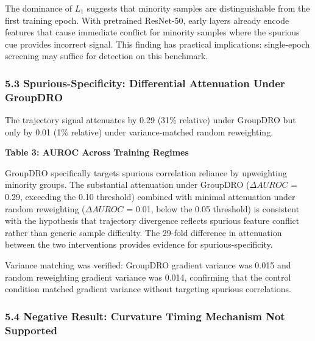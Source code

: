 The dominance of $L_1$ suggests that minority samples are distinguishable from the first training epoch. With pretrained ResNet-50, early layers already encode features that cause immediate conflict for minority samples where the spurious cue provides incorrect signal. This finding has practical implications: single-epoch screening may suffice for detection on this benchmark.

\subsubsection{5.3 Spurious-Specificity: Differential Attenuation Under GroupDRO}

The trajectory signal attenuates by 0.29 (31\% relative) under GroupDRO but only by 0.01 (1\% relative) under variance-matched random reweighting.

\textbf{Table 3: AUROC Across Training Regimes}

\begin{table}[htbp]
\centering
{}
\end{table}

GroupDRO specifically targets spurious correlation reliance by upweighting minority groups. The substantial attenuation under GroupDRO ($\Delta AUROC$ = 0.29, exceeding the 0.10 threshold) combined with minimal attenuation under random reweighting ($\Delta AUROC$ = 0.01, below the 0.05 threshold) is consistent with the hypothesis that trajectory divergence reflects spurious feature conflict rather than generic sample difficulty. The 29-fold difference in attenuation between the two interventions provides evidence for spurious-specificity.

Variance matching was verified: GroupDRO gradient variance was 0.015 and random reweighting gradient variance was 0.014, confirming that the control condition matched gradient variance without targeting spurious correlations.

\subsubsection{5.4 Negative Result: Curvature Timing Mechanism Not Supported}

